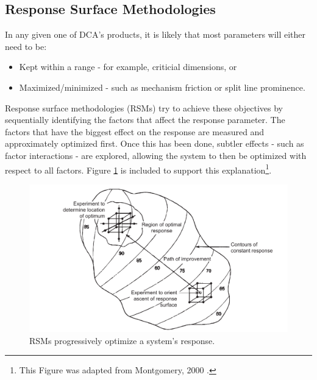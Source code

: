 \documentclass[11pt,a4paper,article]{memoir} %
\begin{document}
\subsection*{Response Surface Methodologies}
In any given one of DCA's products, it is likely that most parameters will either need to be:
\vspace{-14pt}
\begin{itemize}
	\item Kept within a range - for example, criticial dimensions, or
	\item Maximized/minimized - such as mechanism friction or split line prominence.
\end{itemize}
\vspace{-14pt}
Response surface methodologies (RSMs) try to achieve these objectives by sequentially identifying the factors that affect the response parameter. The factors that have the biggest effect on the response are measured and approximately optimized first. Once this has been done, subtler effects - such as factor interactions - are explored, allowing the system to then be optimized with respect to all factors. Figure \ref{fig:RSM_overview} is included to support this explanation\footnote{This Figure was adapted from Montgomery, 2000 \cite{montgomery2000design}.}\cite{montgomery2000design}.
\begin{figure}[h!]
\includegraphics[width=\textwidth]{RSM_overview.pdf}
\caption{RSMs progressively optimize a system's response.}
\label{fig:RSM_overview}
\end{figure}
\end{document}
